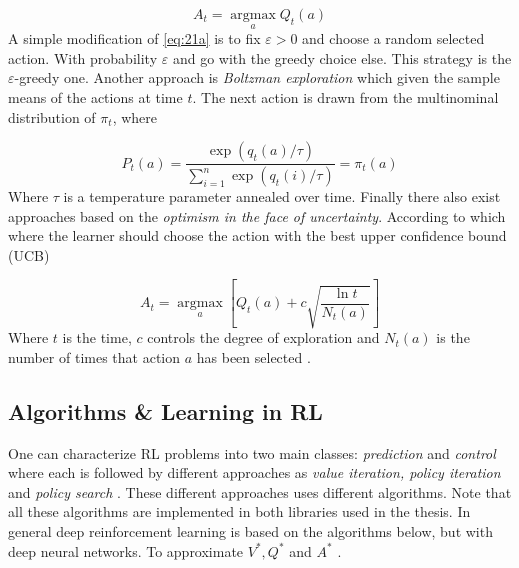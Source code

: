 \documentclass{kththesis}
\theoremstyle{definition}
\begin{document}
\begin{equation}
    \label{eq:21a}
    A_t = \underset{a}{\operatorname{argmax}}Q_t(a)
\end{equation}
A simple modification of \autoref{eq:21a} is to fix $\varepsilon > 0$ and choose a random selected action. With probability $\varepsilon$ and go with the greedy choice else. This strategy is the $\varepsilon$-greedy one. Another approach is \textit{Boltzman exploration} \parencite{sutton1998reinforcement,szepesvari2009algorithms} which given the sample means of the actions at time $t$. The next action is drawn from the multinominal distribution of $\pi_t$, where 

\begin{equation}
    \label{eq:21b}
    P_t(a) = \frac{\exp{(q_{t}(a)/\tau)}}{ \sum_{i=1}^{n}{\exp{(q_{t}(i)/ \tau)}}} = \pi_t(a)
\end{equation}
Where $ \tau$ is a temperature parameter annealed over time.
Finally there also exist approaches based on the \textit{optimism in the face of uncertainty}. According to which where the learner should choose the action with the best upper confidence bound (UCB) \parencite{sutton1998reinforcement, szepesvari2009algorithms}

\begin{equation}
    \label{eq:21c}
    A_t = \underset{a}{\operatorname{argmax}} \left[Q_t(a) + c \sqrt{\frac{\ln{t}}{N_t(a)}} \right]
\end{equation}
Where $t$ is the time, $c$ controls the degree of exploration and $N_t(a)$ is the number of times that action $a$ has been selected \parencite{sutton1998reinforcement}.

\subsection{Algorithms \& Learning in RL}
One can characterize RL problems into two main classes: \textit{prediction} and \textit{control} where each is followed by different approaches as \textit{value iteration, policy iteration} and \textit{policy search} \parencite{szepesvari2009algorithms}. 
\newline
These different approaches uses different algorithms. Note that all these algorithms are implemented in both \parencite{plappert2016kerasrl, baselines} libraries used in the thesis. In general deep reinforcement learning is based on the algorithms below, but with deep neural networks. To approximate $V^{*}, Q^{*}$ and $A^{*}$ \parencite{arulkumaran2017brief}. 
\end{document}
